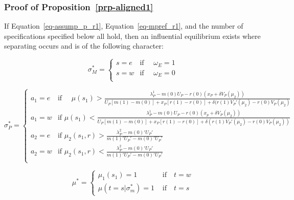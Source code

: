 \documentclass[
  12pt,
]{article}
\theoremstyle{plain}
\theoremstyle{plain}
\theoremstyle{remark}
\begin{document}
\subsubsection{\texorpdfstring{Proof of
Proposition~\ref{prp-aligned1}}{Proof of Proposition~}}\label{proof-of-prp-aligned1}

If Equation~\ref{eq-assump_p_r1}, Equation~\ref{eq-mpref_r1}, and the
number of specifications specified below all hold, then an influential
equilibrium exists where separating occurs and is of the following
character:

\[
\sigma^{*}_M = 
\begin{cases}
s = e  & \text{if } \quad \omega_E = 1\\
s = w  & \text{if } \quad \omega_E = 0 \\
\end{cases}
\]

\[
\sigma^{*}_P = 
\begin{cases}
a_1= e  & \text{if } \quad\mu(s_1)
> \frac{\lambda^1_P - m(0)U_P - r(0)(x_P + \delta V_P(\mu_2))}
 {U_P[ m(1) - m(0) ]+ x_P [r(1) -r(0)] 
 + \delta (r(1)V_P'(\mu_2) - r(0)V_P(\mu_2)}\\
a_1 = w  & \text{if } \mu(s_1)
< \frac{\lambda^1_P - m(0)U_P - r(0)(x_p + \delta V_P(\mu_2))}
 {U_P[ m(1) - m(0) ]+ x_P [r(1) -r(0)] 
 + \delta (r(1)V_P'(\mu_2) - r(0)V_P(\mu_2))}\\
a_2 = e & \text{if } \mu_2(s_1, r) > \frac{\lambda^2_P - m(0)' U_P '}{m(1)' U_P' - m(0)' U_P'}\\
a_2 = w & \text{if } \mu_2(s_1, r) < \frac{\lambda^2_P - m(0)' U_P '}{m(1)' U_P' - m(0)' U_P'}\\
\end{cases}
\]

\[
\mu^* = 
\begin{cases}
\mu_1(s_1) = 1 & \text{ if} \quad t = w\\
\mu(t= s| \sigma^{*}_m) = 1 & \text{ if} \quad t = s
\end{cases}
\]
\end{document}
